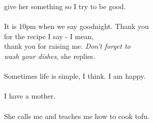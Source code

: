\begin{Parallel}{0.48\textwidth}{0.48\textwidth}
{give her something so I try to be good.\\
\-\ \\It is 10pm when we say goodnight. Thank you \\
for the recipe I say - I mean, \\
thank you for raising me. \emph{Don't forget to} \\
\emph{wash your dishes,} she replies.\\
\-\ \\Sometimes life is simple, I think. I am happy.\\
\-\ \\I have a mother.\\
\-\ \\She calls me and teaches me how to cook tofu.}
\ParallelPar
\end{Parallel}